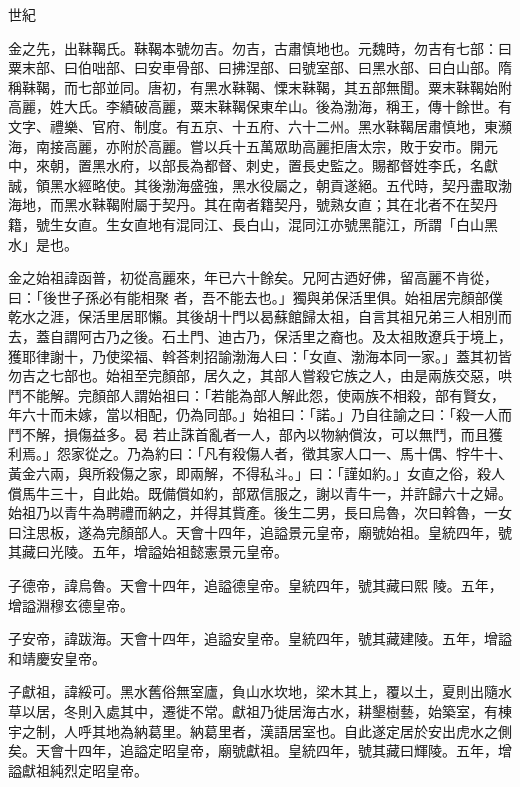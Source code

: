 
\begin{pinyinscope}

 世紀



 金之先，出靺鞨氏。靺鞨本號勿吉。勿吉，古肅慎地也。元魏時，勿吉有七部：曰粟末部、曰伯咄部、曰安車骨部、曰拂涅部、曰號室部、曰黑水部、曰白山部。隋稱靺鞨，而七部並同。唐初，有黑水靺鞨、慄末靺鞨，其五部無聞。粟末靺鞨始附高麗，姓大氏。李績破高麗，粟末靺鞨保東牟山。後為渤海，稱王，傳十餘世。有文字、禮樂、官府、制度。有五京、十五府、六十二州。黑水靺鞨居肅慎地，東瀕海，南接高麗，亦附於高麗。嘗以兵十五萬眾助高麗拒唐太宗，敗于安市。開元中，來朝，置黑水府，以部長為都督、刺史，置長史監之。賜都督姓李氏，名獻誠，領黑水經略使。其後渤海盛強，黑水役屬之，朝貢遂絕。五代時，契丹盡取渤海地，而黑水靺鞨附屬于契丹。其在南者籍契丹，號熟女直；其在北者不在契丹籍，號生女直。生女直地有混同江、長白山，混同江亦號黑龍江，所謂「白山黑水」是也。



 金之始祖諱函普，初從高麗來，年已六十餘矣。兄阿古迺好佛，留高麗不肯從，曰：「後世子孫必有能相聚
 者，吾不能去也。」獨與弟保活里俱。始祖居完顏部僕乾水之涯，保活里居耶懶。其後胡十門以曷蘇館歸太祖，自言其祖兄弟三人相別而去，蓋自謂阿古乃之後。石土門、迪古乃，保活里之裔也。及太祖敗遼兵于境上，獲耶律謝十，乃使梁福、斡荅刺招諭渤海人曰：「女直、渤海本同一家。」蓋其初皆勿吉之七部也。始祖至完顏部，居久之，其部人嘗殺它族之人，由是兩族交惡，哄鬥不能解。完顏部人謂始祖曰：「若能為部人解此怨，使兩族不相殺，部有賢女，年六十而未嫁，當以相配，仍為同部。」始祖曰：「諾。」乃自往諭之曰：「殺一人而鬥不解，損傷益多。曷
 若止誅首亂者一人，部內以物納償汝，可以無鬥，而且獲利焉。」怨家從之。乃為約曰：「凡有殺傷人者，徵其家人口一、馬十偶、牸牛十、黃金六兩，與所殺傷之家，即兩解，不得私斗。」曰：「謹如約。」女直之俗，殺人償馬牛三十，自此始。既備償如約，部眾信服之，謝以青牛一，并許歸六十之婦。始祖乃以青牛為聘禮而納之，并得其貲產。後生二男，長曰烏魯，次曰斡魯，一女曰注思板，遂為完顏部人。天會十四年，追謚景元皇帝，廟號始祖。皇統四年，號其藏曰光陵。五年，增謚始祖懿憲景元皇帝。



 子德帝，諱烏魯。天會十四年，追謚德皇帝。皇統四年，號其藏曰熙
 陵。五年，增謚淵穆玄德皇帝。



 子安帝，諱跋海。天會十四年，追謚安皇帝。皇統四年，號其藏建陵。五年，增謚和靖慶安皇帝。



 子獻祖，諱綏可。黑水舊俗無室廬，負山水坎地，梁木其上，覆以土，夏則出隨水草以居，冬則入處其中，遷徙不常。獻祖乃徙居海古水，耕墾樹藝，始築室，有棟宇之制，人呼其地為納葛里。納葛里者，漢語居室也。自此遂定居於安出虎水之側矣。天會十四年，追謚定昭皇帝，廟號獻祖。皇統四年，號其藏曰輝陵。五年，增謚獻祖純烈定昭皇帝。




\end{pinyinscope}
